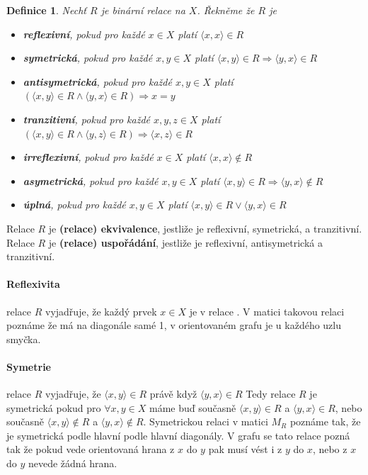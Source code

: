 \documentclass[12pt,a4paper]{article}
\newtheorem{definition}{Definice}
\begin{document}
\begin{definition}
Nechť $R$ je binární relace na $X$. Řekněme že $R$ je
\begin{itemize}
	\item \textbf{reflexivní}, pokud pro každé $x \in X$ platí $\langle x, x \rangle \in R$
	\item \textbf{symetrická}, pokud pro každé $x,y \in X$ platí $\langle x, y \rangle \in R \Rightarrow \langle y, x \rangle \in R$
	\item \textbf{antisymetrická}, pokud pro každé $x,y \in X$ platí \\$(\langle x, y \rangle \in R \wedge \langle y, x \rangle \in R) \Rightarrow x = y$
	\item \textbf{tranzitivní}, pokud pro každé $x,y,z \in X$ platí \\$(\langle x, y \rangle \in R \wedge \langle y, z \rangle \in R) \Rightarrow \langle x, z \rangle \in R$
	\item \textbf{irreflexivní}, pokud pro každé $x \in X$ platí $\langle x,x \rangle \not\in R$
	\item \textbf{asymetrická}, pokud pro každé $x,y \in X$ platí $\langle x, y \rangle \in R \Rightarrow \langle y, x \rangle \not\in R$
	\item \textbf{úplná}, pokud pro každé $x,y \in X$ platí $\langle x, y \rangle \in R \vee \langle y, x \rangle \in R$
\end{itemize}
\end{definition}

Relace $R$ je \textbf{(relace) ekvivalence}, jestliže je reflexivní, symetrická, a tranzitivní. Relace $R$ je \textbf{(relace) uspořádání}, jestliže je reflexivní, anti\-symetrická a tranzitivní.

\paragraph{Reflexivita} relace $R$ vyjadřuje, že každý prvek $x \in X$ je v relace . V matici takovou relaci poznáme že má na diagonále samé 1, v orientovaném grafu je u každého uzlu smyčka.

\paragraph{Symetrie} relace $R$ vyjadřuje, že $\langle x, y \rangle \in R$ právě když  $\langle y, x \rangle \in R$ Tedy relace $R$ je symetrická pokud pro $\forall x,y \in X$ máme buď současně $\langle x, y \rangle \in R$ a  $\langle y, x \rangle \in R$, nebo současně  $\langle x, y \rangle \not\in R$ a  $\langle y, x \rangle \not\in R$. Symetrickou relaci v matici $M_R$ poznáme tak, že je symetrická podle hlavní podle hlavní diagonály. V grafu se tato relace pozná tak že pokud vede orientovaná hrana z $x$ do $y$ pak musí vést i z $y$ do $x$, nebo z $x$ do $y$ nevede žádná hrana.
\end{document}
